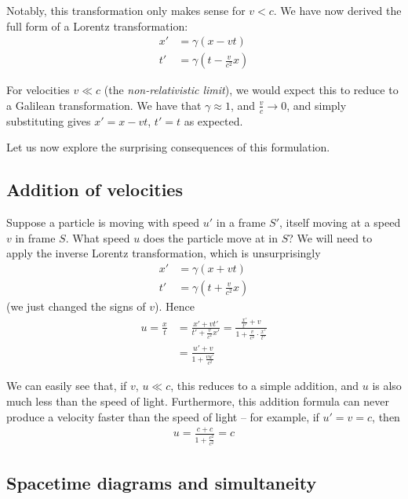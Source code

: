 \documentclass{../../template/note}
\begin{document}
    Notably, this transformation only makes sense for \(v < c\). We have now derived the full form of a Lorentz transformation:
    \begin{align*}
        x' &= \gamma(x-vt) \\
        t' &= \gamma\left(t-\frac v{c^2} x\right)
    \end{align*}
    
    For velocities \(v \ll c\) (the \emph{non-relativistic limit}), we would expect this to reduce to a Galilean transformation. We have that \(\gamma \approx 1\), and \(\frac v c \to 0\), and simply substituting gives \(x' = x-vt\), \(t' = t\) as expected.

    Let us now explore the surprising consequences of this formulation.
    
    \subsection{Addition of velocities}
    
    Suppose a particle is moving with speed \(u'\) in a frame \(S'\), itself moving at a speed \(v\) in frame \(S\). What speed \(u\) does the particle move at in \(S\)? We will need to apply the inverse Lorentz transformation, which is unsurprisingly
    \begin{align*}
        x' &= \gamma(x+vt) \\
        t' &= \gamma\left(t+\frac v{c^2} x\right)
    \end{align*}
    (we just changed the signs of \(v\)). Hence
    \begin{align*}
        u = \frac x t &= \frac{x'+vt'}{t'+ \frac v{c^2}x'} = \frac{\frac{x'}{t'}+v}{1 + \frac{v}{c^2} \cdot \frac{x'}{t'}} \\
        &= \frac{u' + v}{1 + \frac{vu'}{c^2}}
    \end{align*}
    
    We can easily see that, if \(v\), \(u \ll c\), this reduces to a simple addition, and \(u\) is also much less than the speed of light. Furthermore, this addition formula can never produce a velocity faster than the speed of light -- for example, if \(u' = v = c\), then
    \begin{align*}
        u = \frac{c + c}{1 + \frac{c^2}{c^2}} = c
    \end{align*}
    
    \subsection{Spacetime diagrams and simultaneity}
\end{document}

